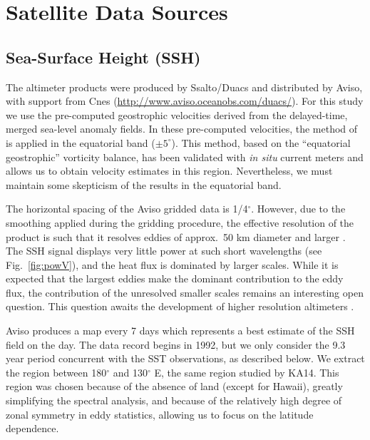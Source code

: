 \documentclass[10pt]{article}
\begin{document}
\section{Satellite Data Sources}

\subsection{Sea-Surface Height (SSH)}
The altimeter products were produced by Ssalto/Duacs and distributed by Aviso, with support from Cnes (\url{http://www.aviso.oceanobs.com/duacs/}). For this study we use the pre-computed geostrophic velocities derived from the delayed-time, merged sea-level anomaly fields. In these pre-computed velocities, the method of \citet{Lagerloef1999} is applied in the equatorial band ($\pm 5^\circ$). This method, based on the ``equatorial geostrophic'' vorticity balance, has been validated with {\em in situ} current meters and allows us to obtain velocity estimates in this region. Nevertheless, we must maintain some skepticism of the results in the equatorial band.

The horizontal spacing of the Aviso gridded data is 1/4$^\circ$. However, due to the smoothing applied during the gridding procedure, the effective resolution of the product is such that it resolves eddies of approx.~50 km diameter and larger \citep{CheltonEtAl2011}. The SSH signal displays very little power at such short wavelengths (see Fig.~\ref{fig:powV}), and the heat flux is dominated by larger scales. While it is expected that the largest eddies make the dominant contribution to the eddy flux, the contribution of the unresolved smaller scales remains an interesting open question. This question awaits the development of higher resolution altimeters \citep{FuFerrari2008}.

Aviso produces a map every 7 days which represents a best estimate of the SSH field on the day. The data record begins in 1992, but we only consider the 9.3 year period concurrent with the SST observations, as described below. We extract the region between 180$^\circ$ and 130$^\circ$ E, the same region studied by KA14. This region was chosen because of the absence of land (except for Hawaii), greatly simplifying the spectral analysis, and because of the relatively high degree of zonal symmetry in eddy statistics, allowing us to focus on the latitude dependence.
\end{document}
